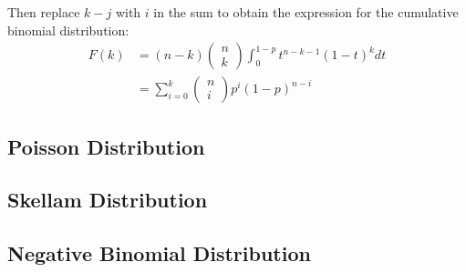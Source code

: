 \documentclass[11pt]{report} %
\begin{document}
Then replace $k - j$ with $i$ in the sum to obtain the expression for the cumulative binomial distribution:
\begin{align}
F\left(k\right) &= \left(n - k\right)\begin{pmatrix}n \\ k\end{pmatrix}\int_{0}^{1 - p}t^{n - k - 1}\left(1 - t\right)^{k}dt \\
&= \sum_{i = 0}^{k}\begin{pmatrix}n \\ i\end{pmatrix}p^{i}\left(1 - p\right)^{n - i}
\end{align}

\subsection{Poisson Distribution}

\subsection{Skellam Distribution}

\subsection{Negative Binomial Distribution}
\end{document}

